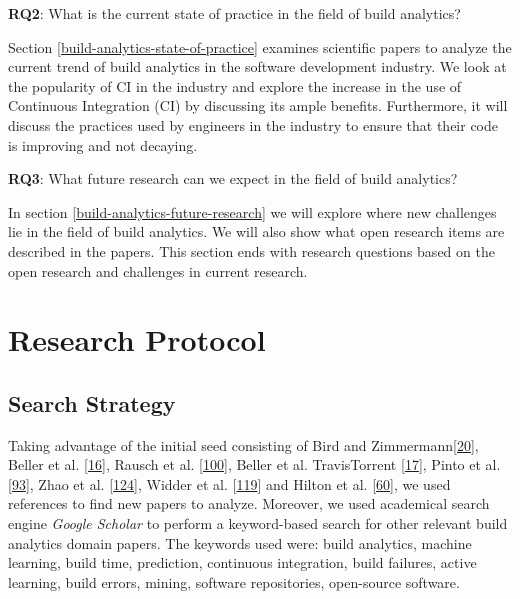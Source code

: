 \documentclass[]{book}
\begin{document}
\textbf{RQ2}: What is the current state of practice in the field of
build analytics?

Section \ref{build-analytics-state-of-practice} examines scientific
papers to analyze the current trend of build analytics in the software
development industry. We look at the popularity of CI in the industry
and explore the increase in the use of Continuous Integration (CI) by
discussing its ample benefits. Furthermore, it will discuss the
practices used by engineers in the industry to ensure that their code is
improving and not decaying.

\textbf{RQ3}: What future research can we expect in the field of build
analytics?

In section \ref{build-analytics-future-research} we will explore where
new challenges lie in the field of build analytics. We will also show
what open research items are described in the papers. This section ends
with research questions based on the open research and challenges in
current research.

\section{Research Protocol}\label{build-analytics-research-protocol}

\subsection{Search Strategy}\label{search-strategy}

Taking advantage of the initial seed consisting of Bird and
Zimmermann{[}\protect\hyperlink{ref-bird2017predicting}{20}{]}, Beller
et al. {[}\protect\hyperlink{ref-beller2017oops}{16}{]}, Rausch et al.
{[}\protect\hyperlink{ref-rausch2017empirical}{100}{]}, Beller et al.
TravisTorrent {[}\protect\hyperlink{ref-beller2017travistorrent}{17}{]},
Pinto et al. {[}\protect\hyperlink{ref-pinto2018work}{93}{]}, Zhao et
al. {[}\protect\hyperlink{ref-zhao2017impact}{124}{]}, Widder et al.
{[}\protect\hyperlink{ref-widder2018m}{119}{]} and Hilton et al.
{[}\protect\hyperlink{ref-hilton2016usage}{60}{]}, we used references to
find new papers to analyze. Moreover, we used academical search engine
\emph{Google Scholar} to perform a keyword-based search for other
relevant build analytics domain papers. The keywords used were: build
analytics, machine learning, build time, prediction, continuous
integration, build failures, active learning, build errors, mining,
software repositories, open-source software.
\end{document}
